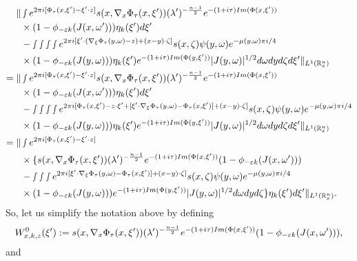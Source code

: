 \documentclass[12pt, reqno]{amsart}
\theoremstyle{definition}
\theoremstyle{remark}
\numberwithin{equation}{section}
\begin{document}
\begin{align*}
  \Vert &\smallint e^{2\pi i[\Phi_\tau(x,\xi') -\xi'\cdot z]}s(x,\nabla_x\Phi_\tau(x,\xi'))(\lambda')^{-\frac{n-1}{2}}e^{-(1+i\tau)\textnormal{Im}(\Phi(x,\xi'))}\\
    &\times (1-\phi_{-\varepsilon k}(J(x,\omega')))\eta_{k}(\xi')d\xi'\\
    &- \smallint\smallint\smallint\smallint e^{2\pi i[\xi'\cdot( \nabla_\xi\Phi_\tau(y,\omega)-z)+ (x-y)\cdot \zeta]}s(x,\zeta)\psi(y,\omega)e^{-\mu(y,\omega)\pi i/4} \\
&\times (1-\phi_{-\varepsilon k}(J(y,\omega)))\eta_{k}(\xi')e^{-(1+i\tau)\textnormal{Im}(\Phi(y,\xi'))} |J(y,\omega)|^{1/2}d\omega dy d\zeta d\xi'\Vert_{L^1(\mathbb{R}^n_x)}\\
=\Vert & \smallint e^{2\pi i[\Phi_\tau(x,\xi') -\xi'\cdot z]}s(x,\nabla_x\Phi_\tau(x,\xi'))(\lambda')^{-\frac{n-1}{2}}e^{-(1+i\tau)\textnormal{Im}(\Phi(x,\xi'))}\\
    &\times (1-\phi_{-\varepsilon k}(J(x,\omega')))\eta_{k}(\xi')d\xi'\\
    &- \smallint\smallint\smallint\smallint e^{2\pi i[\Phi_\tau(x,\xi')-z\cdot \xi'+[\xi'\cdot \nabla_\xi\Phi_\tau(y,\omega)-\Phi_\tau(x,\xi')]+ (x-y)\cdot \zeta]}s(x,\zeta)\psi(y,\omega)e^{-\mu(y,\omega)\pi i/4} \\
&\times (1-\phi_{-\varepsilon k}(J(y,\omega)))\eta_{k}(\xi')e^{-(1+i\tau)\textnormal{Im}(\Phi(y,\xi'))} |J(y,\omega)|^{1/2}d\omega dy d\zeta d\xi'\Vert_{L^1(\mathbb{R}^n_x)}\\
=\Vert & \smallint e^{2\pi i[\Phi_\tau(x,\xi') -\xi'\cdot z]}\\
    &\times \{s(x,\nabla_x\Phi_\tau(x,\xi'))(\lambda')^{-\frac{n-1}{2}}e^{-(1+i\tau)\textnormal{Im}(\Phi(x,\xi'))} (1-\phi_{-\varepsilon k}(J(x,\omega')))\\
    &- \smallint\smallint\smallint e^{2\pi i[\xi'\cdot \nabla_\xi\Phi_\tau(y,\omega)-\Phi_\tau(x,\xi')]+ (x-y)\cdot \zeta]}s(x,\zeta)\psi(y,\omega)e^{-\mu(y,\omega)\pi i/4} \\
&\times (1-\phi_{-\varepsilon k}(J(y,\omega)))e^{-(1+i\tau)\textnormal{Im}(\Phi(y,\xi'))} |J(y,\omega)|^{1/2}d\omega dy d\zeta\}\eta_{k}(\xi') d\xi'\Vert_{L^1(\mathbb{R}^n_x)}.
\end{align*}So, let us simplify the notation above by defining
\begin{align*}
 W^{0}_{x,k,z}(\xi'):=  s(x,\nabla_x\Phi_\tau(x,\xi'))(\lambda')^{-\frac{n-1}{2}}e^{-(1+i\tau)\textnormal{Im}(\Phi(x,\xi'))} (1-\phi_{-\varepsilon k}(J(x,\omega'))),
\end{align*} and 
\end{document}
